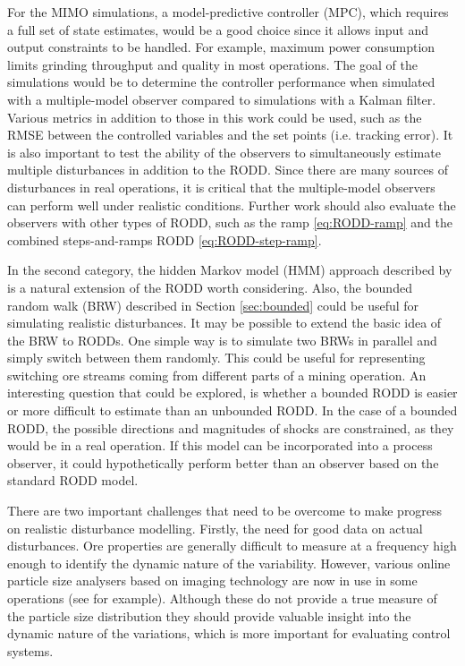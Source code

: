 For the \gls{MIMO} simulations, a model-predictive controller (\gls{MPC}), which requires a full set of state estimates, would be a good choice since it allows input and output constraints to be handled. For example, maximum power consumption limits grinding throughput and quality in most operations. The goal of the simulations would be to determine the controller performance when simulated with a multiple-model observer compared to simulations with a Kalman filter. Various metrics in addition to those in this work could be used, such as the \gls{RMSE} between the controlled variables and the set points (i.e. tracking error). It is also important to test the ability of the observers to simultaneously estimate multiple disturbances in addition to the \gls{RODD}. Since there are many sources of disturbances in real operations, it is critical that the multiple-model observers can perform well under realistic conditions. Further work should also evaluate the observers with other types of \gls{RODD}, such as the ramp \eqref{eq:RODD-ramp} and the combined steps-and-ramps \gls{RODD} \eqref{eq:RODD-step-ramp}.

In the second category, the hidden Markov model (\gls{HMM}) approach described by \cite{wong_realistic_2009} is a natural extension of the \gls{RODD} worth considering. Also, the bounded random walk (\gls{BRW}) described in Section \ref{sec:bounded} could be useful for simulating realistic disturbances. It may be possible to extend the basic idea of the \gls{BRW} to \gls{RODD}s. One simple way is to simulate two \gls{BRW}s in parallel and simply switch between them randomly. This could be useful for representing switching ore streams coming from different parts of a mining operation. An interesting question that could be explored, is whether a bounded \gls{RODD} is easier or more difficult to estimate than an unbounded \gls{RODD}. In the case of a bounded \gls{RODD}, the possible directions and magnitudes of shocks are constrained, as they would be in a real operation. If this model can be incorporated into a process observer, it could hypothetically perform better than an observer based on the standard \gls{RODD} model.

There are two important challenges that need to be overcome to make progress on realistic disturbance modelling. Firstly, the need for good data on actual disturbances. Ore properties are generally difficult to measure at a frequency high enough to identify the dynamic nature of the variability. However, various online particle size analysers based on imaging technology are now in use in some operations (see \cite{steyn_investigating_2018} for example). Although these do not provide a true measure of the particle size distribution they should provide valuable insight into the dynamic nature of the variations, which is more important for evaluating control systems. 

